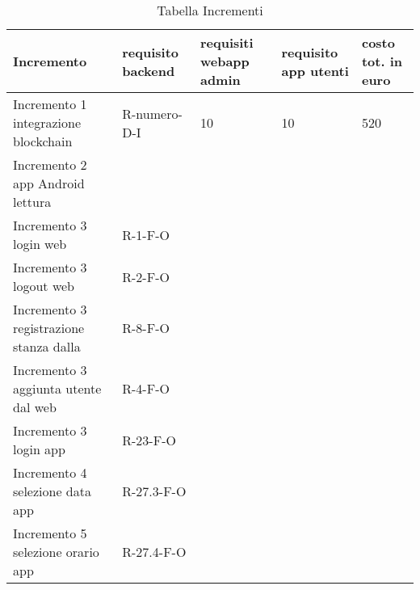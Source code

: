 \hypertarget{TabellaIncrementi}{}
\begin{longtable}{ C{0.15\textwidth} C{0.15\textwidth} C{0.15\textwidth} C{0.15\textwidth} C{0.15\textwidth} }
    \caption{Tabella Incrementi}                                                                                 \\
    \rowcolor{\primaryColor}
    \textcolor{\secondaryColor}{\textbf{Incremento}} & \textcolor{\secondaryColor}{\textbf{requisito backend}}  &\textcolor{\secondaryColor}{\textbf{requisiti webapp admin}}&\textcolor{\secondaryColor}{\textbf{requisito app utenti}}&\textcolor{\secondaryColor}{\textbf{costo tot. in euro}}\\ \endhead
    {Incremento 1 integrazione blockchain} & {R-numero-D-I } & {10 } & {10}&  {520}\\
    {Incremento 2 app Android lettura } & {} & {}& {}& {}\\
    {Incremento 3 login web} & {R-1-F-O} & {}& {}& {}\\
    {Incremento 3 logout web} & {R-2-F-O} & {}& {}& {}\\
    {Incremento 3 registrazione stanza dalla} & {R-8-F-O} & {}& {}& {}\\
    {Incremento 3 aggiunta utente dal web} & {R-4-F-O} & {}& {}& {}\\
    {Incremento 3 login app} & {R-23-F-O} & {}& {}& {}\\
    {Incremento 4 selezione data app} & {R-27.3-F-O} & {}& {}& {}\\
    {Incremento 5 selezione orario app} & {R-27.4-F-O} & {}& {}& {}\\
    
    

\end{longtable}
